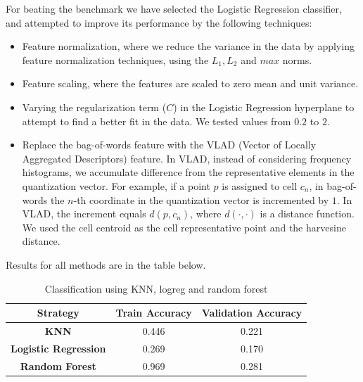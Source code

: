 \documentclass[12pt]{article}
\begin{document}
  For beating the benchmark we have selected the Logistic Regression classifier,
  and attempted to improve its performance by the following techniques:
  \begin{itemize}
    \item Feature normalization, where we reduce the variance in the data by
      applying feature normalization techniques, using the $L_1, L_2$ and $max$ norms.
      \item Feature scaling, where the features are scaled to zero mean and unit variance.
    \item Varying the regularization term ($C$) in the Logistic Regression hyperplane
      to attempt to find a better fit in the data. We tested values from $0.2$ to $2$.
     \item Replace the bag-of-words feature with the VLAD (Vector of Locally
       Aggregated Descriptors) feature. In VLAD,
       instead of considering frequency histograms, we accumulate difference
       from the representative elements in the quantization vector. For example,
       if a point $p$ is assigned to cell $c_n$, in bag-of-words the $n$-th
       coordinate in the quantization vector is incremented by $1$. In VLAD, the
       increment equals $d(p,c_n)$, where $d(\cdot,\cdot)$ is a distance function.
       We used the cell centroid as the cell representative point and the
       harvesine distance. 
     
  \end{itemize}
  Results for all methods are in the table below.
 
 \begin{table}[H]
 	\centering
 	\begin{tabular}{|c|c|c|}
 		\hline
 		\textbf{Strategy}            & \textbf{Train Accuracy} & \textbf{Validation Accuracy} \\ \hline
 		\textbf{KNN}                 & 0.446                   & 0.221                        \\ \hline
 		\textbf{Logistic Regression} & 0.269                   & 0.170                        \\ \hline
 		\textbf{Random Forest}       & 0.969                   & 0.281                        \\ \hline
 	\end{tabular}
 \caption{Classification using KNN, logreg and random forest}
 \label{class}
 \end{table}
\end{document}
